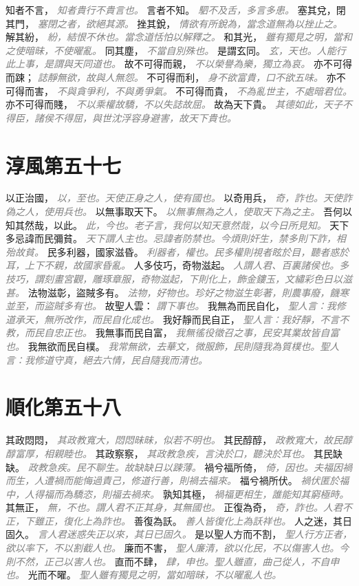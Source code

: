 \documentclass[a4paper,zihao=-4,oneside,landscape,UTF8]{ctexart}
\newcommand{\zhushi}[1]{\scriptsize{\textit{\textcolor{gray}{#1}}}\normalsize}
\begin{document}
知者不言，
\zhushi{知者貴行不貴言也。}
言者不知。
\zhushi{駟不及舌，多言多患。}
塞其兌，閉其門，
\zhushi{塞閉之者，欲絕其源。}
挫其銳，
\zhushi{情欲有所銳為，當念道無為以挫止之。}
解其紛，
\zhushi{紛，結恨不休也。當念道恬怕以解釋之。}
和其光，
\zhushi{雖有獨見之明，當和之使暗昧，不使曜亂。}
同其塵，
\zhushi{不當自別殊也。}
是謂玄同。
\zhushi{玄，天也。人能行此上事，是謂與天同道也。}
故不可得而親，
\zhushi{不以榮譽為樂，獨立為哀。}
亦不可得而踈；
\zhushi{誌靜無欲，故與人無怨。}
不可得而利，
\zhushi{身不欲富貴，口不欲五味。}
亦不可得而害，
\zhushi{不與貪爭利，不與勇爭氣。}
不可得而貴，
\zhushi{不為亂世主，不處暗君位。}
亦不可得而賤，
\zhushi{不以乘權故驕，不以失誌故屈。}
故為天下貴。
\zhushi{其德如此，天子不得臣，諸侯不得屈，與世沈浮容身避害，故天下貴也。}


\section{淳風第五十七}

以正治國，
\zhushi{以，至也。天使正身之人，使有國也。}
以奇用兵，
\zhushi{奇，詐也。天使詐偽之人，使用兵也。}
以無事取天下。
\zhushi{以無事無為之人，使取天下為之主。}
吾何以知其然哉，以此。
\zhushi{此，今也。老子言，我何以知天意然哉，以今日所見知。}
天下多忌諱而民彌貧。
\zhushi{天下謂人主也。忌諱者防禁也。今煩則奸生，禁多則下詐，相殆故貧。}
民多利器，國家滋昏。
\zhushi{利器者，權也。民多權則視者眩於目，聽者惑於耳，上下不親，故國家昏亂。}
人多伎巧，奇物滋起。
\zhushi{人謂人君、百裏諸侯也。多技巧，謂刻畫宮觀，雕琢章服，奇物滋起，下則化上，飾金鏤玉，文繡彩色日以滋甚。}
法物滋彰，盜賊多有。
\zhushi{法物，好物也。珍好之物滋生彰著，則農事廢，饑寒並至，而盜賊多有也。}
故聖人雲：
\zhushi{謂下事也。}
我無為而民自化，
\zhushi{聖人言：我修道承天，無所改作，而民自化成也。}
我好靜而民自正，
\zhushi{聖人言：我好靜，不言不教，而民自忠正也。}
我無事而民自富，
\zhushi{我無徭役徵召之事，民安其業故皆自富也。}
我無欲而民自樸。
\zhushi{我常無欲，去華文，微服飾，民則隨我為質樸也。聖人言：我修道守真，絕去六情，民自隨我而清也。}


\section{順化第五十八}

其政悶悶，
\zhushi{其政教寬大，悶悶昧昧，似若不明也。}
其民醇醇，
\zhushi{政教寬大，故民醇醇富厚，相親睦也。}
其政察察，
\zhushi{其政教急疾，言決於口，聽決於耳也。}
其民缺缺。
\zhushi{政教急疾。民不聊生。故缺缺日以踈薄。}
禍兮福所倚，
\zhushi{倚，因也。夫福因禍而生，人遭禍而能悔過責己，修道行善，則禍去福來。}
福兮禍所伏。
\zhushi{禍伏匿於福中，人得福而為驕恣，則福去禍來。}
孰知其極，
\zhushi{禍福更相生，誰能知其窮極時。}
其無正，
\zhushi{無，不也。謂人君不正其身，其無國也。}
正復為奇，
\zhushi{奇，詐也。人君不正，下雖正，復化上為詐也。}
善復為訞。
\zhushi{善人皆復化上為訞祥也。}
人之迷，其日固久。
\zhushi{言人君迷惑失正以來，其日已固久。}
是以聖人方而不割，
\zhushi{聖人行方正者，欲以率下，不以割截人也。}
廉而不害，
\zhushi{聖人廉清，欲以化民，不以傷害人也。今則不然，正己以害人也。}
直而不肆，
\zhushi{肆，申也。聖人雖直，曲己從人，不自申也。}
光而不曜。
\zhushi{聖人雖有獨見之明，當如暗昧，不以曜亂人也。}
\end{document}
